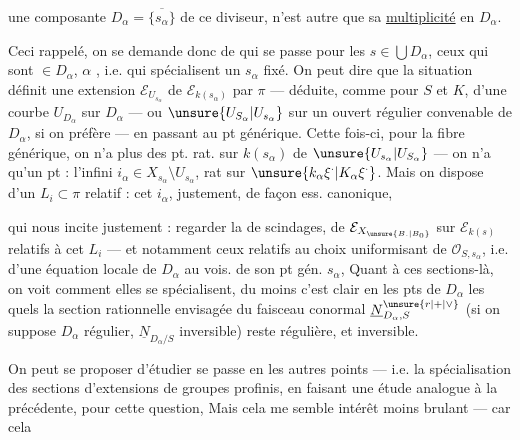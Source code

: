 une composante $D_\alpha=\overline{\{s_\alpha\}}$ de ce diviseur, n'est autre que sa \uline{multiplicité} en $D_\alpha$.

Ceci rappelé, on se demande donc de  qui se passe pour les $s\in\bigcup D_\alpha$,     ceux qui sont $\in D_\alpha$, $\alpha$ , i.e. qui spécialisent un $s_\alpha$ fixé. On peut dire que la situation définit une extension $\mathcal E_{U_{s_\alpha}}$ de $\mathcal E_{k(s_\alpha)}$ par $\pi$ --- déduite, comme  pour $S$ et $K$, d'une courbe  $U_{D_\alpha}$ sur $D_\alpha$ --- ou $\unsure{U_{S_\alpha}|U_{s_\alpha}}$ sur un ouvert régulier convenable de $D_\alpha$, si on préfère --- en passant au pt générique. Cette fois-ci, pour la fibre générique, on n'a plus des  pt. rat. sur $k(s_\alpha)$ de $\unsure{U_{s_\alpha}|U_{S_\alpha}}$ --- on n'a qu'un pt : l'infini $i_\alpha\in X_{s_\alpha}\setminus U_{s_\alpha}$, rat sur $\unsure{k_\alpha\xi^{\cdot}|K_\alpha\xi^{\cdot}}$. Mais on dispose  d'un $L_i\subset\pi$ relatif : cet $i_\alpha$, justement, de façon ess. canonique,

qui nous incite justement : regarder la  de scindages, de $\mathcal E_{X_{\unsure{B.|B_0}}}$ sur $\mathcal E_{k(s)}$ relatifs à cet $L_i$ --- et notamment ceux relatifs au choix  uniformisant de $\mathcal O_{S,s_\alpha}$, i.e. d'une équation locale de $D_\alpha$ au vois. de son pt gén. $s_\alpha$,   Quant à ces sections-là, on voit comment elles se spécialisent, du moins c'est clair en les pts de $D_\alpha$  les quels la section rationnelle envisagée du faisceau conormal $\underline N_{D_\alpha,S}^{\unsure{r|+|\vee}}$ (si on suppose $D_\alpha$ régulier, \unsure{\deleted{)}|)|\&}   $\underline N_{D_\alpha/S}$ inversible) reste régulière, et inversible.

On peut se proposer d'étudier   se passe en les autres points --- i.e. la spécialisation des sections  d'extensions de groupes profinis, en faisant une étude analogue à la précédente, pour cette question, Mais cela me semble   intérêt moins brulant --- car cela 

